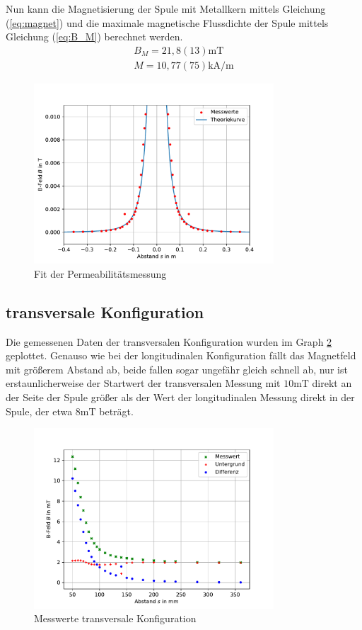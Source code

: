 \documentclass[11pt, a4paper]{article}
\begin{document}
    
    Nun kann die Magnetisierung der Spule mit Metallkern mittels Gleichung (\ref{eq:magnet}) und die maximale magnetische Flussdichte der Spule mittels Gleichung (\ref{eq:B_M}) berechnet werden.
   \begin{align}
        B_{M} = 21,8(13) \si{\milli\tesla} \\
        M = 10,77(75) \si{\kilo\ampere\per\metre}
    \end{align}
    \begin{figure}
        \centering
        \includegraphics[width=0.8\textwidth]{mur.pdf}
        \caption{Fit der Permeabilitätsmessung}
        \label{fig:murfit}
    \end{figure}

    \subsection{transversale Konfiguration}
    Die gemessenen Daten der transversalen Konfiguration wurden im Graph \ref{fig:transmess} geplottet.
    Genauso wie bei der longitudinalen Konfiguration fällt das Magnetfeld mit größerem Abstand ab, beide fallen sogar ungefähr gleich schnell ab, nur ist erstaunlicherweise der Startwert der transversalen Messung mit $10 \si{\milli\tesla}$ direkt an der Seite der Spule größer als der Wert der longitudinalen Messung direkt in der Spule, der etwa $8 \si{\milli\tesla}$ beträgt.
    \begin{figure}[h]
        \centering
        \includegraphics[width=0.8\textwidth]{raw2.pdf}
        \caption{Messwerte transversale Konfiguration}
        \label{fig:transmess}
    \end{figure}
\end{document}
